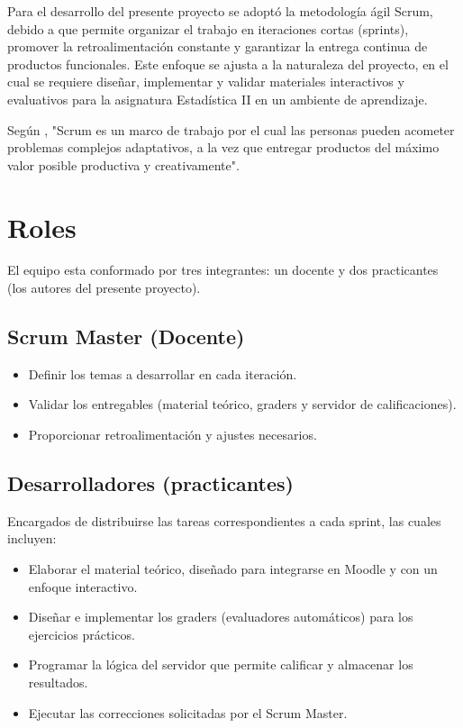 \documentclass[letter,oneside,12pt,spanish]{report}
\begin{document}
Para el desarrollo del presente proyecto se adoptó la metodología ágil Scrum, debido a que permite organizar el trabajo en iteraciones cortas (sprints), promover la retroalimentación constante y garantizar la entrega continua de productos funcionales. Este enfoque se ajusta a la naturaleza del proyecto, en el cual se requiere diseñar, implementar y validar materiales interactivos y evaluativos para la asignatura Estadística II en un ambiente de aprendizaje.

Según \cite{schwaber2013scrum}, "Scrum es un marco de trabajo por el cual las personas pueden acometer problemas complejos adaptativos, a la vez que entregar productos del máximo valor posible productiva y creativamente".

\section{Roles}

El equipo esta conformado por tres integrantes: un docente y dos practicantes (los autores del presente proyecto).

\subsection*{Scrum Master (Docente)}
\begin{itemize}[leftmargin=*]
	\item Definir los temas a desarrollar en cada iteración.
	\item Validar los entregables (material teórico, graders y servidor de calificaciones).
	\item Proporcionar retroalimentación y ajustes necesarios.
\end{itemize}

\subsection*{Desarrolladores (practicantes)}
Encargados de distribuirse las tareas correspondientes a cada sprint, las cuales incluyen:
\begin{itemize}[leftmargin=*]
	\item Elaborar el material teórico, diseñado para integrarse en Moodle y con un enfoque interactivo.
	\item Diseñar e implementar los graders (evaluadores automáticos) para los ejercicios prácticos.
	\item Programar la lógica del servidor que permite calificar y almacenar los resultados.
	\item Ejecutar las correcciones solicitadas por el Scrum Master.
\end{itemize}
\end{document}
